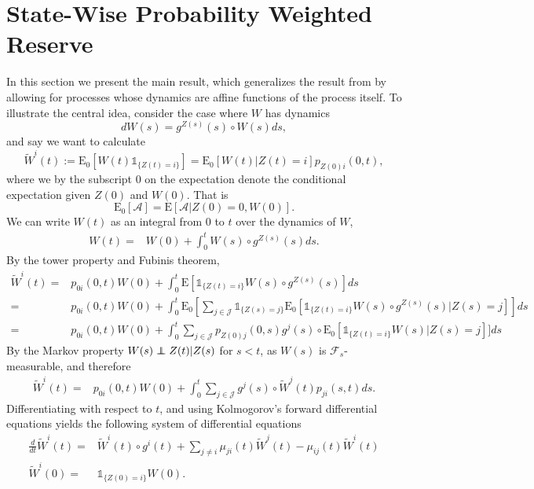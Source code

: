 \documentclass[12pt]{article}
\newcommand{\E}{\text{E}}
\newcommand{\indic}[1]{\mathds{1}_{ \{ #1 \} }}
\newcommand\independent{\protect\mathpalette{\protect\independenT}{\perp}}
\def\independenT#1#2{\mathrel{\rlap{$#1#2$}\mkern2mu{#1#2}}}
\theoremstyle{my_thm}
\begin{document}
\section{State-Wise Probability Weighted Reserve} \label{sec:diff}
In this section we present the main result, which generalizes the result from \citet{Norberg} by allowing for processes whose dynamics are affine functions of the process itself. To illustrate the central idea, consider the case where $W$ has dynamics
$$
dW(s)=g^{Z(s)}(s) \circ W(s) ds,
$$
and say we want to calculate 
$$
\tilde{W}^i(t):=\E_0[W(t)\indic{Z(t)=i}]
=\E_0[W(t)|Z(t)=i]p_{Z(0)i}(0,t),
$$ 
where we by the subscript 0 on the expectation denote the conditional expectation given $Z(0)$ and $W(0)$. That is 
$$
\E_0[\mathcal{A}]=\E [\mathcal{A}|Z(0)=0,W(0)].
$$
We can write $W(t)$ as an integral from 0 to $t$ over the dynamics of $W$,
\begin{align*}
W(t)
=& W(0)+\int_0^t W(s)  \circ g^{Z(s)}(s) ds.
\end{align*}
By the tower property and Fubinis theorem,
\begin{align*}
\tilde{W}^i(t)
=&  p_{0i}(0,t) W(0) +
\int_0^t \E[ \indic{Z(t)=i} W(s)  \circ g^{Z(s)}(s)] ds
\\
=&   p_{0i}(0,t) W(0) +
\int_0^t \E_0 \left[ \sum_{j \in \mathcal{J}} \indic{Z(s)=j}\E_0[ \indic{Z(t)=i} W(s) \circ  g^{Z(s)}(s)|Z(s)=j] \right] ds\\
=&   p_{0i}(0,t) W(0)+
\int_0^t  \sum_{j \in \mathcal{J}} p_{Z(0)j}(0,s)g^{j}(s) \circ  \E_0[ \indic{Z(t)=i} W(s)|Z(s)=j]] ds
\end{align*}
By the Markov property $W(s)\independent Z(t)|Z(s)$ for $s<t$, as $W(s)$ is $\mathcal{F}_s$-measurable, and therefore
\begin{align*}
\tilde{W}^i(t)=&  p_{0i}(0,t) W(0) +
\int_0^t  \sum_{j \in \mathcal{J}} g^{j}(s)  \circ  \tilde{W}^j(t) p_{ji}(s,t)ds.
\end{align*}
Differentiating with respect to $t$, and using Kolmogorov's forward differential equations yields the following system of differential equations
\begin{align*}
\frac{d}{dt} \tilde{W}^i(t)=&\tilde{W}^i(t) \circ g^i(t)+ \sum_{j\neq i} \mu_{ji}(t)\tilde{W}^j(t)-\mu_{ij}(t)\tilde{W}^i(t)
\\
\tilde{W}^i(0)=&\indic{Z(0)=i}W(0).
\end{align*}
\end{document}
